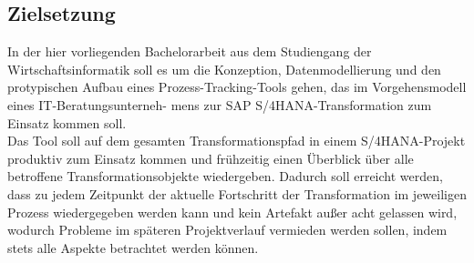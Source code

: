 \subsection{Zielsetzung}
In der hier vorliegenden Bachelorarbeit aus dem Studiengang der Wirtschaftsinformatik soll es um die Konzeption, Datenmodellierung und den protypischen Aufbau eines Prozess-Tracking-Tools gehen, das im Vorgehensmodell eines IT-Beratungsunterneh- mens zur SAP S/4HANA-Transformation zum Einsatz kommen soll.\\ 
Das Tool soll auf dem gesamten Transformationspfad in einem S/4HANA-Projekt produktiv zum Einsatz kommen und frühzeitig einen 
Überblick über alle betroffene Transformationsobjekte wiedergeben. 
Dadurch soll erreicht werden, dass zu jedem Zeitpunkt der aktuelle Fortschritt der Transformation im jeweiligen Prozess wiedergegeben werden kann und kein Artefakt außer acht gelassen wird, wodurch Probleme im späteren Projektverlauf vermieden werden sollen, indem stets alle Aspekte betrachtet werden können.

